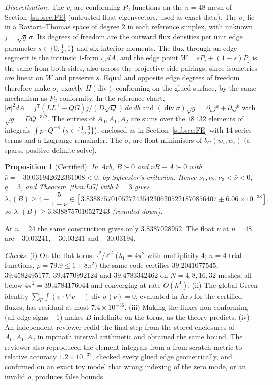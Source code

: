 \documentclass[11pt]{amsart}
\newtheorem{proposition}[theorem]{Proposition}
\theoremstyle{definition}
\theoremstyle{remark}
\newcommand{\R}{\mathbb{R}}
\newcommand{\Z}{\mathbb{Z}}
\begin{document}
\emph{Discretisation.} The $v_i$ are conforming $P_2$ functions on the $n=48$ mesh of
Section~\ref{subsec:FE} (untrusted float eigenvectors, used as exact data). The $\sigma_i$ lie in a
Raviart--Thomas space of degree $2$ in each reference simplex, with unknown $j=\sqrt g\,\sigma$.
Its degrees of freedom are the outward flux densities per unit edge parameter $s\in\{0,\frac12,1\}$
and six interior moments. The flux through an edge segment is the intrinsic $1$-form
$\iota_\sigma dA$, and the edge point $W=sP_i+(1-s)P_j$ is the same from both sides, also across the
projective side pairings, since isometries are linear on $W$ and preserve $s$. Equal and opposite
edge degrees of freedom therefore make $\sigma_i$ exactly $H(\mathrm{div})$-conforming on the glued
surface, by the same mechanism as $P_2$ conformity. In the reference chart,
$|\sigma|^2dA=j^{\mathsf T}(LL^{\mathsf T}-QG)j/(D\sqrt Q)\,da\,db$ and $(\operatorname{div}\sigma)\sqrt g=\partial_aj^a+\partial_bj^b$
with $\sqrt g=DQ^{-3/2}$. The entries of $A_0,A_1,A_2$ are sums over the $18\,432$ elements of integrals
$\int p\cdot Q^{-s}$ ($s\in\{\frac12,\frac32\}$), enclosed as in Section~\ref{subsec:FE} with $14$ series terms
and a Lagrange remainder. The $\sigma_i$ are float minimisers of $b_G(w_i,w_i)$ (a sparse
positive definite solve).

\begin{proposition}[Certified]\label{prop:LG}
In Arb, $B\succ0$ and $\bar\nu B-A\succ0$ with $\bar\nu=-30.031942622361008<0$, by Sylvester's
criterion. Hence $\nu_1,\nu_2,\nu_3<\bar\nu<0$, $q=3$, and Theorem~\ref{thm:LG} with $k=3$ gives
\[
\lambda_1(B)\ge4-\frac{5}{1-\bar\nu}\in[3.8388757010527243542306205221870856407\pm6.06\times10^{-38}],
\]
so $\lambda_1(B)\ge3.8388757010527243$ (rounded down).
\end{proposition}

At $n=24$ the same construction gives only $3.8387028952$. The float $\nu$ at $n=48$ are
$-30.03241$, $-30.03241$ and $-30.03194$.

\emph{Checks.} (i) On the flat torus $\R^2/\Z^2$ ($\lambda_1=4\pi^2$ with multiplicity $4$; $n=4$ trial
functions, $\rho=79.9\le1+8\pi^2$) the same code certifies $39.2041077545$, $39.4582495177$,
$39.4770992124$ and $39.4783342462$ on $N=4,8,16,32$ meshes, all below $4\pi^2=39.4784176044$ and
converging at rate $O(h^4)$. (ii) The global Green identity
$\sum_T\int(\sigma\cdot\nabla v+(\operatorname{div}\sigma)v)=0$, evaluated in Arb for the certified fluxes,
has residual at most $7.4\times10^{-36}$. (iii) Making the fluxes non-conforming (all edge signs $+1$) makes
$B$ indefinite on the torus, as the theory predicts. (iv) An independent reviewer redid the final step
from the stored enclosures of $A_0,A_1,A_2$ in mpmath interval arithmetic and obtained the same bound. The
reviewer also reproduced the element integrals from a from-scratch metric to relative accuracy
$1.2\times10^{-32}$, checked every glued edge geometrically, and confirmed on an exact toy model that wrong
indexing of the zero mode, or an invalid $\rho$, produces false bounds.
\end{document}
